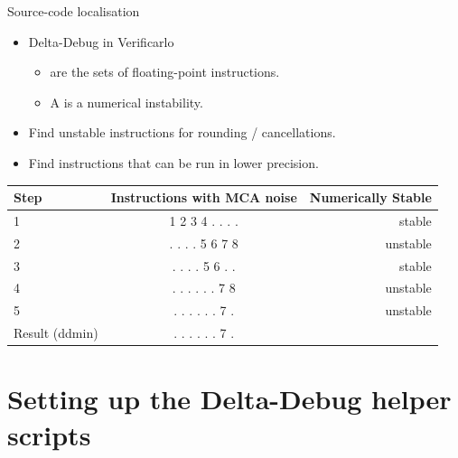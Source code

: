 \documentclass[aspectratio=169]{beamer}
\begin{document}
      \begin{frame}{Source-code localisation}
        \begin{itemize}
            \item Delta-Debug in Verificarlo
                  \begin{itemize}
                      \item {} are the sets of floating-point instructions.
                      \item A  is a numerical instability.
                  \end{itemize}
            \item Find unstable instructions for rounding / cancellations.
            \item Find instructions that can be run in lower precision.
        \end{itemize}
    
        \begin{table}[h]
          \centering
          \begin{tabular}{lcr}
                Step           & Instructions with MCA noise & Numerically Stable \\
                \midrule
                1              & 1 2 3 4 . . . .             & stable             \\
                2              & . . . . 5 6 7 8             & unstable           \\
                \midrule
                3              & . . . . 5 6 . .             & stable             \\
                4              & . . . . . . 7 8             & unstable           \\
                \midrule
                5              & . . . . . . 7 .             & unstable           \\
                Result (ddmin) & . . . . . . 7 .             &                    \\
          \end{tabular}
        \end{table}
      \end{frame}
    
  \section{Setting up the Delta-Debug helper scripts}
    
\end{document}
